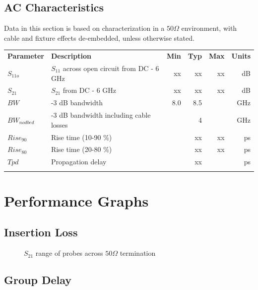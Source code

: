 \documentclass[11pt]{article}
\newcommand{\thinhline}{\Xhline{1\arrayrulewidth}}
\newcommand{\thickhline}{\Xhline{2.5\arrayrulewidth}}
\begin{document}

\pagebreak
\subsection{AC Characteristics}

Data in this section is based on characterization in a $50 \Omega$ environment, with cable and fixture effects
de-embedded, unless otherwise stated.

\begin{tabularx}{16cm}{lXrrrr}
\thickhline
\textbf{Parameter} & \textbf{Description} & \textbf{Min} & \textbf{Typ} & \textbf{Max} & \textbf{Units} \\
\thickhline
$S_{11o}$ & $S_{11}$ across open circuit from DC - 6 GHz & xx & xx & xx & dB \\
\thinhline
$S_{21}$ & $S_{21}$ from DC - 6 GHz & xx & xx & xx & dB \\
\thinhline
$BW$ & -3 dB bandwidth & 8.0 & 8.5 & & GHz \\
\thinhline
$BW_{nodbed}$ & -3 dB bandwidth including cable losses &  & 4 & & GHz \\
\thinhline
$Rise_{90}$ & Rise time (10-90 \%) &  & xx & xx & ps \\
\thinhline
$Rise_{80}$ & Rise time (20-80 \%) &  & xx & xx & ps \\
\thinhline
$Tpd$ & Propagation delay &  & xx &  & ps \\
\thickhline
\end{tabularx}

\pagebreak
\section{Performance Graphs}

\subsection{Insertion Loss}

\begin{figure}[h!]
\centering
\caption{$S_{21}$ range of probes across $50\Omega$ termination}
\label{s21-variation}
\end{figure}

\subsection{Group Delay}
\end{document}
